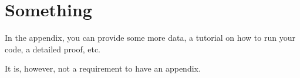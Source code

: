 \chapter{Something}\label{sec:something}

In the appendix, you can provide some more data, a tutorial on how to run your code, a detailed proof, etc.

It is, however, not a requirement to have an appendix.

\cleardoublepage